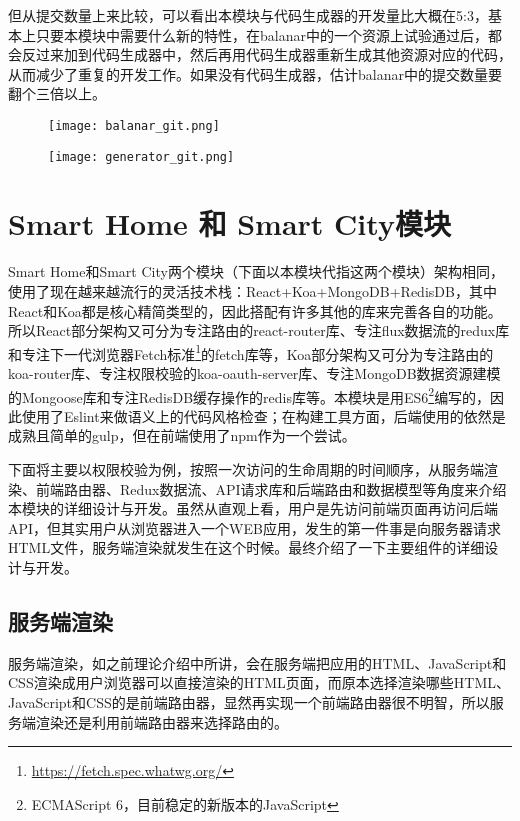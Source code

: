 但从提交数量上来比较，可以看出本模块与代码生成器的开发量比大概在5:3，基本上只要本模块中需要什么新的特性，在balanar中的一个资源上试验通过后，都会反过来加到代码生成器中，然后再用代码生成器重新生成其他资源对应的代码，从而减少了重复的开发工作。如果没有代码生成器，估计balanar中的提交数量要翻个三倍以上。
\begin{figure}[H]
 \centering
 \texttt{[image: balanar\_git.png]}

 \vspace{0.5cm}

 \texttt{[image: generator\_git.png]}
\end{figure}

\section{Smart Home 和 Smart City模块}
Smart Home和Smart City两个模块（下面以本模块代指这两个模块）架构相同，使用了现在越来越流行的灵活技术栈：React+Koa+MongoDB+RedisDB，其中React和Koa都是核心精简类型的，因此搭配有许多其他的库来完善各自的功能。所以React部分架构又可分为专注路由的react-router库、专注flux数据流的redux库和专注下一代浏览器Fetch标准\footnote{\url{https://fetch.spec.whatwg.org/}}的fetch库等，Koa部分架构又可分为专注路由的koa-router库、专注权限校验的koa-oauth-server库、专注MongoDB数据资源建模的Mongoose库和专注RedisDB缓存操作的redis库等。本模块是用ES6\footnote{ECMAScript 6，目前稳定的新版本的JavaScript}编写的，因此使用了Eslint来做语义上的代码风格检查；在构建工具方面，后端使用的依然是成熟且简单的gulp，但在前端使用了npm作为一个尝试。

下面将主要以权限校验为例，按照一次访问的生命周期的时间顺序，从服务端渲染、前端路由器、Redux数据流、API请求库和后端路由和数据模型等角度来介绍本模块的详细设计与开发。虽然从直观上看，用户是先访问前端页面再访问后端API，但其实用户从浏览器进入一个WEB应用，发生的第一件事是向服务器请求HTML文件，服务端渲染就发生在这个时候。最终介绍了一下主要组件的详细设计与开发。
\subsection{服务端渲染}
服务端渲染，如之前理论介绍中所讲，会在服务端把应用的HTML、JavaScript和CSS渲染成用户浏览器可以直接渲染的HTML页面，而原本选择渲染哪些HTML、JavaScript和CSS的是前端路由器，显然再实现一个前端路由器很不明智，所以服务端渲染还是利用前端路由器来选择路由的。

